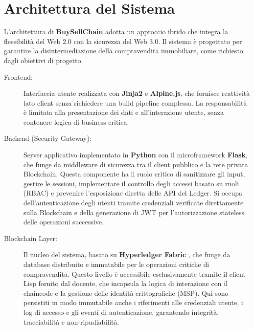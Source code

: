 \chapter{Architettura del Sistema}

L'architettura di \textbf{BuySellChain} adotta un approccio ibrido che integra la flessibilità del Web 2.0 con la sicurezza del Web 3.0. Il sistema è progettato per garantire la disintermediazione della compravendita immobiliare, come richiesto dagli obiettivi di progetto.

\begin{description}
    \item[Frontend:] Interfaccia utente realizzata con \textbf{Jinja2} e \textbf{Alpine.js}, che fornisce reattività lato client senza richiedere una build pipeline complessa. La responsabilità è limitata alla presentazione dei dati e all'interazione utente, senza contenere logica di business critica.
    
    \item[Backend (Security Gateway):] 
    Server applicativo implementato in \textbf{Python} con il microframework \textbf{Flask}, che funge da middleware di sicurezza tra il client pubblico e la rete privata Blockchain. Questa componente ha il ruolo critico di sanitizzare gli input, gestire le sessioni, implementare il controllo degli accessi basato su ruoli (RBAC) e prevenire l'esposizione diretta delle API del Ledger. Si occupa dell'autenticazione degli utenti tramite credenziali verificate direttamente sulla Blockchain e della generazione di JWT per l'autorizzazione stateless delle operazioni successive.
    
    \item[Blockchain Layer:] 
    Il nucleo del sistema, basato su \textbf{Hyperledger Fabric} \cite{HyperledgerFabricDocs}, che funge da database distribuito e immutabile per le operazioni critiche di compravendita. Questo livello è accessibile esclusivamente tramite il client Lisp fornito dal docente, che incapsula la logica di interazione con il chaincode e la gestione delle identità crittografiche (MSP). Qui sono persistiti in modo immutabile anche i riferimenti alle credenziali utente, i log di accesso e gli eventi di autenticazione, garantendo integrità, tracciabilità e non-ripudiabilità.
\end{description}

